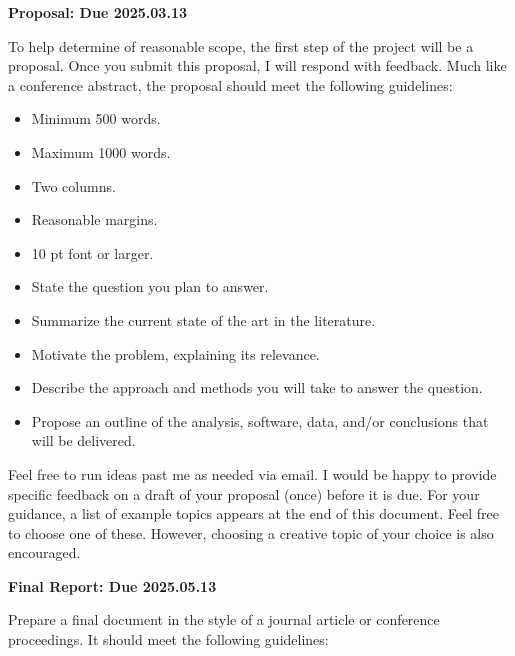 \documentclass[12pts, answers]{exam}
\newcommand{\duedate}{2025.05.13}
\begin{document}
\begin{questions}
\addpoints
\question \textbf{Proposal: Due 2025.03.13}

To help determine of reasonable scope, the first step of the project will be a
proposal. Once you submit this proposal, I will respond with feedback. Much
like a conference abstract, the proposal should meet the following guidelines:

\begin{itemize}
\item Minimum 500 words.
\item Maximum 1000 words.
\item Two columns.
\item Reasonable margins.
\item 10 pt font or larger.
\item State the question you plan to answer.
\item Summarize the current state of the art in the literature.
\item Motivate the problem, explaining its relevance.
\item Describe the approach and methods you will take to answer the question.
\item Propose an outline of the analysis, software, data, and/or conclusions that will be delivered.
\end{itemize}

Feel free to run ideas past me as needed via email. I would be happy to provide 
        specific feedback on a draft of your proposal (once) before it is due. 
        For your guidance, a list of example topics appears at the end of this 
        document. Feel free to choose one of these.  However, choosing a 
        creative topic of your choice is also encouraged.


\question \textbf{Final Report: Due \duedate}

Prepare a final document in the style of a journal article or conference
proceedings. It should meet the following guidelines:


\end{questions}
\end{document}
